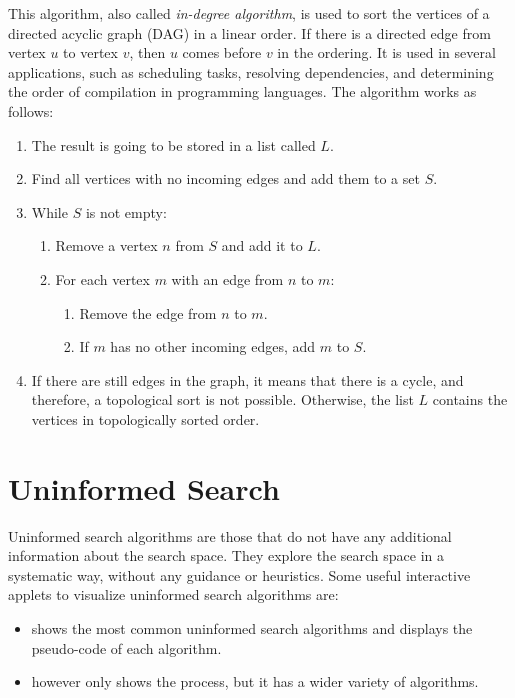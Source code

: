 This algorithm, also called \emph{in-degree algorithm}, is used to sort the vertices of a directed acyclic graph (DAG) in a linear order. If there is a directed edge from vertex $u$ to vertex $v$, then $u$ comes before $v$ in the ordering. It is used in several applications, such as scheduling tasks, resolving dependencies, and determining the order of compilation in programming languages. The algorithm works as follows:
\begin{enumerate}
    \item The result is going to be stored in a list called $L$.
    \item Find all vertices with no incoming edges and add them to a set $S$.
    \item While $S$ is not empty:
    \begin{enumerate}
        \item Remove a vertex $n$ from $S$ and add it to $L$.
        \item For each vertex $m$ with an edge from $n$ to $m$:
        \begin{enumerate}
            \item Remove the edge from $n$ to $m$.
            \item If $m$ has no other incoming edges, add $m$ to $S$.
        \end{enumerate}
    \end{enumerate}
    \item If there are still edges in the graph, it means that there is a cycle, and therefore, a topological sort is not possible. Otherwise, the list $L$ contains the vertices in topologically sorted order.
\end{enumerate}

\section{Uninformed Search}

Uninformed search algorithms are those that do not have any additional information about the search space. They explore the search space in a systematic way, without any guidance or heuristics. Some useful interactive applets to visualize uninformed search algorithms are:
\begin{itemize}
    \item {} shows the most common uninformed search algorithms and displays the pseudo-code of each algorithm.
    \item {} however only shows the process, but it has a wider variety of algorithms.
\end{itemize}

